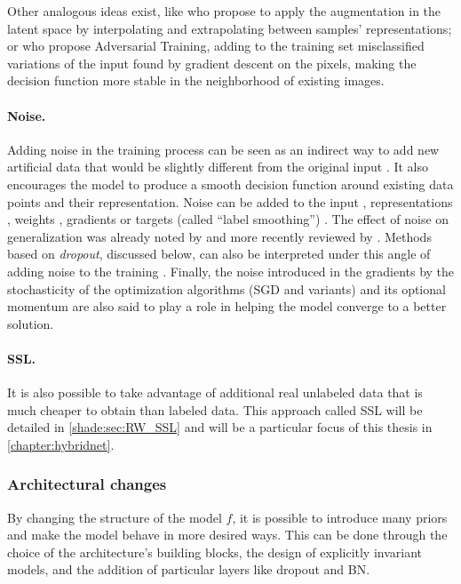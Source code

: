 Other analogous ideas exist, like \citet{devries2017dataset} who propose to apply the augmentation in the latent space by interpolating and extrapolating between samples' representations; or \citet{goodfellow2014explaining} who propose Adversarial Training, adding to the training set misclassified variations of the input found by gradient descent on the pixels, making the decision function more stable in the neighborhood of existing images.

\paragraph{Noise.}
Adding noise in the training process can be seen as an indirect way to add new artificial data that would be slightly different from the original input \citep{grandvalet1997noise}. It also encourages the model to produce a smooth decision function around existing data points and their representation. Noise can be added to the input \citep{plaut1986experiments}, representations \citep{devries2017dataset}, weights \citep{kang2016shakeout}, gradients \citep{neelakantan2015adding} or targets (called ``label smoothing'') \citep{szegedy2016rethinking}. The effect of noise on generalization was already noted by \citet{an1996effects} and more recently reviewed by \citet{noh2017regularizing,kukavcka2017regularization}. Methods based on \textit{dropout}, discussed below, can also be interpreted under this angle of adding noise to the training \citep{li2016whiteout}. Finally, the noise introduced in the gradients by the stochasticity of the optimization algorithms (\acs{SGD} and variants) and its optional momentum are also said to play a role in helping the model converge to a better solution.

\paragraph{\acf{SSL}.}
It is also possible to take advantage of additional real unlabeled data that is much cheaper to obtain than labeled data. This approach called \acf{SSL} will be detailed in \autoref{shade:sec:RW_SSL} and will be a particular focus of this thesis in \autoref{chapter:hybridnet}.



\subsubsection{Architectural changes}

By changing the structure of the model $f$, it is possible to introduce many priors and make the model behave in more desired ways. This can be done through the choice of the architecture's building blocks, the design of explicitly invariant models, and the addition of particular layers like dropout and \ac{BN}.


